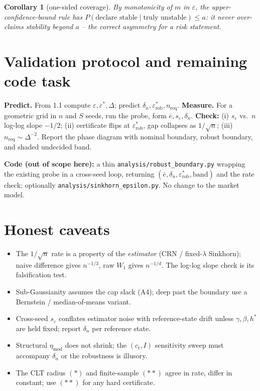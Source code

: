 \documentclass[11pt]{article}
\newtheorem{corollary}{Corollary}
\newcommand{\eps}{\varepsilon}
\newcommand{\dn}{\delta_n}
\newcommand{\code}[1]{\texttt{#1}}
\newcommand{\epsstar}{\eps^{*}}
\newcommand{\epsrob}{\eps^{*}_{\mathrm{rob}}}
\newcommand{\ebar}{\bar e}
\begin{document}
\begin{corollary}[one-sided coverage]
By monotonicity of $m$ in $\eps$, the upper-confidence-bound rule has
$P(\text{declare stable}\mid\text{truly unstable})\le a$: it never over-claims
stability beyond $a$ -- the correct asymmetry for a risk statement.
\end{corollary}

\section{Validation protocol and remaining code task}

\textbf{Predict.} From 1.1 compute $\eps,\epsstar,\Delta$; predict $\dn,\epsrob,n_{\mathrm{req}}$.
\textbf{Measure.} For a geometric grid in $n$ and $S$ seeds, run the probe, form
$\ebar,s_\eps,\dn$.
\textbf{Check:} (i) $s_\eps$ vs.\ $n$ log-log slope $-1/2$; (ii) certificate flips at
$\epsrob$, gap collapses as $1/\sqrt{n}$; (iii) $n_{\mathrm{req}}\sim\Delta^{-2}$.
Report the phase diagram with nominal boundary, robust boundary, and shaded
undecided band.

\textbf{Code (out of scope here):} a thin \code{analysis/robust\_boundary.py}
wrapping the existing probe in a cross-seed loop, returning
$(\ebar,\dn,\epsrob,\text{band})$ and the rate check; optionally
\code{analysis/sinkhorn\_epsilon.py}. No change to the market model.

\section{Honest caveats}
\begin{itemize}[leftmargin=1.4em]
  \item The $1/\sqrt{n}$ rate is a property of the \emph{estimator} (CRN /
  fixed-$\lambda$ Sinkhorn); naive difference gives $n^{-1/3}$, raw $W_1$ gives
  $n^{-1/d}$. The log-log slope check is its falsification test.
  \item Sub-Gaussianity assumes the cap slack (A4); deep past the boundary use a
  Bernstein / median-of-means variant.
  \item Cross-seed $s_\eps$ conflates estimator noise with reference-state drift
  unless $\gamma,\beta,h^*$ are held fixed; report $\dn$ per reference state.
  \item Structural $\eta_{\mathrm{mod}}$ does not shrink; the $(c_t,I)$ sensitivity
  sweep must accompany $\dn$ or the robustness is illusory.
  \item The CLT radius $(*)$ and finite-sample $(**)$ agree in rate, differ in
  constant; use $(**)$ for any hard certificate.
\end{itemize}
\end{document}
